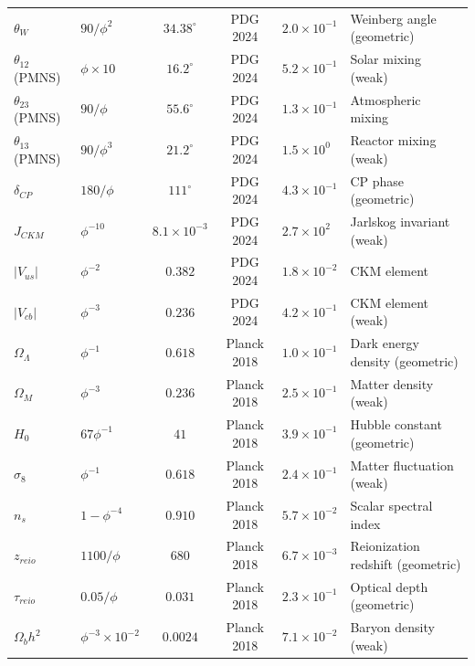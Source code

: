 \begin{longtable}{p{3.5cm}p{4cm}ccp{2cm}p{3cm}}
$\theta_W$ & $90/\phi^2$ & $34.38^\circ$ & PDG 2024 & $2.0\times10^{-1}$ & Weinberg angle (geometric) \\
$\theta_{12}$ (PMNS) & $\phi\times10$ & $16.2^\circ$ & PDG 2024 & $5.2\times10^{-1}$ & Solar mixing (weak) \\
$\theta_{23}$ (PMNS) & $90/\phi$ & $55.6^\circ$ & PDG 2024 & $1.3\times10^{-1}$ & Atmospheric mixing \\
$\theta_{13}$ (PMNS) & $90/\phi^3$ & $21.2^\circ$ & PDG 2024 & $1.5\times10^{0}$ & Reactor mixing (weak) \\
$\delta_{CP}$ & $180/\phi$ & $111^\circ$ & PDG 2024 & $4.3\times10^{-1}$ & CP phase (geometric) \\
$J_{CKM}$ & $\phi^{-10}$ & $8.1\times10^{-3}$ & PDG 2024 & $2.7\times10^{2}$ & Jarlskog invariant (weak) \\
$|V_{us}|$ & $\phi^{-2}$ & $0.382$ & PDG 2024 & $1.8\times10^{-2}$ & CKM element \\
$|V_{cb}|$ & $\phi^{-3}$ & $0.236$ & PDG 2024 & $4.2\times10^{-1}$ & CKM element (weak) \\

$\Omega_\Lambda$ & $\phi^{-1}$ & $0.618$ & Planck 2018 & $1.0\times10^{-1}$ & Dark energy density (geometric) \\
$\Omega_M$ & $\phi^{-3}$ & $0.236$ & Planck 2018 & $2.5\times10^{-1}$ & Matter density (weak) \\
$H_0$ & $67\phi^{-1}$ & $41$ & Planck 2018 & $3.9\times10^{-1}$ & Hubble constant (geometric) \\
$\sigma_8$ & $\phi^{-1}$ & $0.618$ & Planck 2018 & $2.4\times10^{-1}$ & Matter fluctuation (weak) \\
$n_s$ & $1 - \phi^{-4}$ & $0.910$ & Planck 2018 & $5.7\times10^{-2}$ & Scalar spectral index \\
$z_{reio}$ & $1100/\phi$ & $680$ & Planck 2018 & $6.7\times10^{-3}$ & Reionization redshift (geometric) \\
$\tau_{reio}$ & $0.05/\phi$ & $0.031$ & Planck 2018 & $2.3\times10^{-1}$ & Optical depth (geometric) \\
$\Omega_b h^2$ & $\phi^{-3}\times10^{-2}$ & $0.0024$ & Planck 2018 & $7.1\times10^{-2}$ & Baryon density (weak) \\


\end{longtable}
